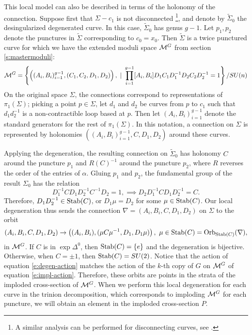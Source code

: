 	This local model can also be described in terms of the holonomy of the connection. Suppose first that $\Sigma - c_1$ is not disconnected \footnote{A similar analysis can be performed for disconnecting curves, see \cite[Page 10]{biswas_degenerations_2021}.}, and denote by $\tilde{\Sigma}_0$ the desingularized degenerated curve. In this case, $\tilde{\Sigma}_0$ has genus $g-1$. Let $p_1, p_2$ denote the punctures in $\tilde{\Sigma}$ corresponding to $c_0 = x_0$. Then $\tilde{\Sigma}$ is a twice punctured curve for which we have the extended moduli space $\mathcal{M}^G$ from section \ref{s:mastermoduli}:
	\begin{equation}
		\mathcal{M}^G = \left\{\left((A_i,B_i)_{i=1}^{g-1}, (C_1,C_2,D_1,D_2)\right), ~|~ \prod_{i=1}^{g-1}[A_i,B_i]D_1C_1D_1^{-1}D_2C_2D_2^{-1} = 1\right\} / SU(n)
	\end{equation}
	On the original space $\Sigma$, the connections correspond to representations of $\pi_1(\Sigma)$; picking a point $p\in\Sigma$, let $d_1$ and $d_2$ be curves from $p$ to $c_1$ such that $d_1d^{-1}_2$ is a non-contractible loop based at $p$. Then let $(A_i,B_i)_{i=1}^{g-1}$ denote the standard generators for the rest of $\pi_1(\Sigma)$. In this notation, a connection on $\Sigma$ is represented by holonomies $\left((A_i,B_i)_{i=1}^{g-1}, C,D_1,D_2\right)$ around these curves.
	
	Applying the degeneration, the resulting connection on $\tilde{\Sigma}_0$ has holonomy $C$ around the puncture $p_1$ and $R(C)^{-1}$ around the puncture $p_2$, where $R$ reverses the order of the entries of $\alpha$. Gluing $p_1$ and $p_2$, the fundamental group of the result $\Sigma_0$ has the relation
	\begin{equation}
	 D_1^{-1}CD_1D_2^{-1}C^{-1}D_2 = 1, \implies D_2D_1^{-1}CD_1D_2^{-1} = C.
	\end{equation}
	Therefore, $D_1D_2^{-1} \in \text{Stab}(C)$, or $D_1\mu = D_2$ for some $\mu\in \text{Stab}(C)$. Our local degeneration thus sends the connection $\nabla = (A_i,B_i,C,D_1,D_2)$ on $\Sigma$ to the orbit
	\begin{equation}
		\label{e:degen-action}
		(A_i,B_i,C,D_1,D_2) \to \left(
		(A_i,B_i), (\mu C \mu^{-1}, D_1, D_1 \mu)\right), ~\mu \in \text{Stab}(C)
		= \text{Orb}_{\text{Stab} (C)} (\nabla),
	\end{equation}
	in $\mathcal{M}^G$. If $C$ is in $\exp \Delta^0$, then $\text{Stab}(C) = \{e\}$ and the degeneration is bijective. Otherwise, when $C = \pm 1$, then $\text{Stab}(C) = SU(2)$. Notice that the action of equation \ref{e:degen-action} matches the action of the $k$-th copy of $G$ on $\mathcal{M}^G$ of equation \ref{e:impl-action}. Therefore, these orbits are points in the strata of the imploded cross-section of $\mathcal{M}^G$. When we perform this local degeneration for each curve in the trinion decomposition, which corresponds to imploding $\mathcal{M}^G$ for each puncture, we will obtain an element in the imploded cross-section $P$. 
 	

